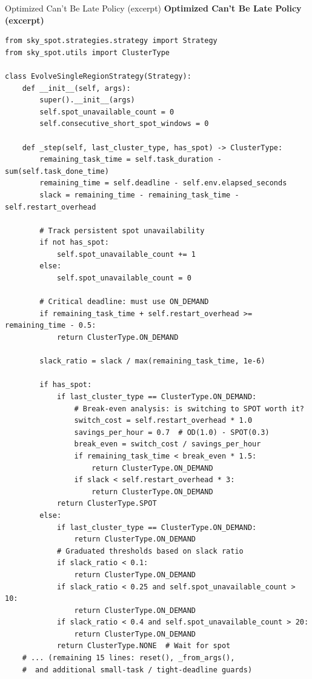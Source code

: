 \documentclass[sigconf]{acmart}
\newenvironment{promptbox}[1][]{%
  \par\smallskip
  \def\promptboxtitle{#1}%
  \begin{snugshade}%
  \ifx\promptboxtitle\empty\else
    \noindent\textbf{\small\promptboxtitle}\par\nobreak\smallskip
  \fi
  \small\ttfamily\noindent\ignorespaces
}{%
  \end{snugshade}%
  \par\smallskip
}
\begin{document}
\begin{promptbox}[Optimized Can't Be Late Policy (excerpt)]
\begin{lstlisting}[aboveskip=0pt,belowskip=0pt,numbers=none,frame=none,backgroundcolor=\color{gray!5}]
from sky_spot.strategies.strategy import Strategy
from sky_spot.utils import ClusterType

class EvolveSingleRegionStrategy(Strategy):
    def __init__(self, args):
        super().__init__(args)
        self.spot_unavailable_count = 0
        self.consecutive_short_spot_windows = 0

    def _step(self, last_cluster_type, has_spot) -> ClusterType:
        remaining_task_time = self.task_duration - sum(self.task_done_time)
        remaining_time = self.deadline - self.env.elapsed_seconds
        slack = remaining_time - remaining_task_time - self.restart_overhead

        # Track persistent spot unavailability
        if not has_spot:
            self.spot_unavailable_count += 1
        else:
            self.spot_unavailable_count = 0

        # Critical deadline: must use ON_DEMAND
        if remaining_task_time + self.restart_overhead >= remaining_time - 0.5:
            return ClusterType.ON_DEMAND

        slack_ratio = slack / max(remaining_task_time, 1e-6)

        if has_spot:
            if last_cluster_type == ClusterType.ON_DEMAND:
                # Break-even analysis: is switching to SPOT worth it?
                switch_cost = self.restart_overhead * 1.0
                savings_per_hour = 0.7  # OD(1.0) - SPOT(0.3)
                break_even = switch_cost / savings_per_hour
                if remaining_task_time < break_even * 1.5:
                    return ClusterType.ON_DEMAND
                if slack < self.restart_overhead * 3:
                    return ClusterType.ON_DEMAND
            return ClusterType.SPOT
        else:
            if last_cluster_type == ClusterType.ON_DEMAND:
                return ClusterType.ON_DEMAND
            # Graduated thresholds based on slack ratio
            if slack_ratio < 0.1:
                return ClusterType.ON_DEMAND
            if slack_ratio < 0.25 and self.spot_unavailable_count > 10:
                return ClusterType.ON_DEMAND
            if slack_ratio < 0.4 and self.spot_unavailable_count > 20:
                return ClusterType.ON_DEMAND
            return ClusterType.NONE  # Wait for spot
    # ... (remaining 15 lines: reset(), _from_args(),
    #  and additional small-task / tight-deadline guards)
\end{lstlisting}
\end{promptbox}
\end{document}
